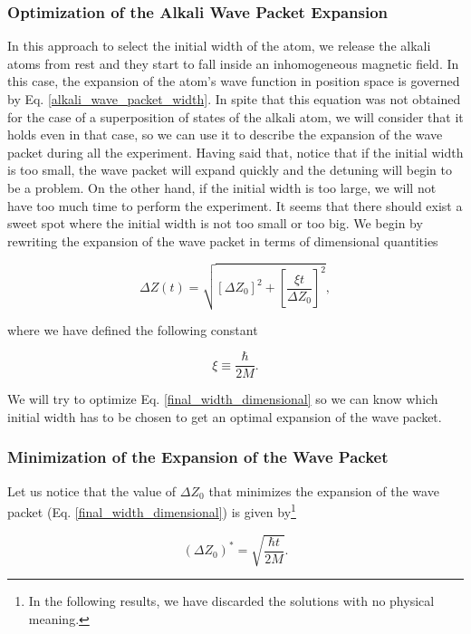 \documentclass{article}
\begin{document}
\subsubsection{Optimization of the Alkali Wave Packet Expansion}
In this approach to select the initial width of the atom, we release the alkali atoms from rest and they start to fall inside an inhomogeneous magnetic field. In this case, the expansion of the atom's wave function in position space is governed by Eq. \ref{alkali_wave_packet_width}. In spite that this equation was not obtained for the case of a superposition of states of the alkali atom, we will consider that it holds even in that case, so we can use it to describe the expansion of the wave packet during all the experiment. Having said that, notice that if the initial width is too small, the wave packet will expand quickly and the detuning will begin to be a problem. On the other hand, if the initial width is too large, we will not have too much time to perform the experiment. It seems that there should exist a sweet spot where the initial width is not too small or too big. We begin by rewriting the expansion of the wave packet in terms of dimensional quantities

\begin{equation}\label{final_width_dimensional}
\Delta Z (t) = \sqrt{[\Delta Z_{0}]^{2} + \left[\frac{\xi t}{\Delta Z_{0}} \right]^{2}},
\end{equation}

where we have defined the following constant

\begin{equation}\label{xi_definition_for_expansion}
    \xi \equiv \frac{\hbar}{2M}.
\end{equation}

We will try to optimize Eq. \ref{final_width_dimensional} so we can know which initial width has to be chosen to get an optimal expansion of the wave packet.

\subsubsection{Minimization of the Expansion of the Wave Packet}
Let us notice that the value of $\Delta Z_{0}$ that minimizes the expansion of the wave packet (Eq. \ref{final_width_dimensional}) is given by\footnote{In the following results, we have discarded the solutions with no physical meaning.}

\begin{equation}\label{initial_width_minimizes_final_width}
    (\Delta Z_{0})^{\ast} = \sqrt{\frac{\hbar t }{2M}}.
\end{equation}
\end{document}
